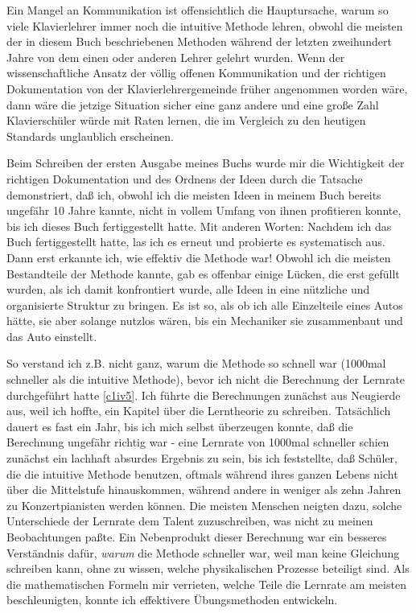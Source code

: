 Ein Mangel an Kommunikation ist offensichtlich die Hauptursache, warum so viele Klavierlehrer immer noch die intuitive Methode lehren, obwohl die meisten der in diesem Buch beschriebenen Methoden während der letzten zweihundert Jahre von dem einen oder anderen Lehrer gelehrt wurden.
Wenn der wissenschaftliche Ansatz der völlig offenen Kommunikation und der richtigen Dokumentation von der Klavierlehrergemeinde früher angenommen worden wäre, dann wäre die jetzige Situation sicher eine ganz andere und eine große Zahl Klavierschüler würde mit Raten lernen, die im Vergleich zu den heutigen Standards unglaublich erscheinen.

Beim Schreiben der ersten Ausgabe meines Buchs wurde mir die Wichtigkeit der richtigen Dokumentation und des Ordnens der Ideen durch die Tatsache demonstriert, daß ich, obwohl ich die meisten Ideen in meinem Buch bereits ungefähr 10 Jahre kannte, nicht in vollem Umfang von ihnen profitieren konnte, bis ich dieses Buch fertiggestellt hatte.
Mit anderen Worten: Nachdem ich das Buch fertiggestellt hatte, las ich es erneut und probierte es systematisch aus.
Dann erst erkannte ich, wie effektiv die Methode war!
Obwohl ich die meisten Bestandteile der Methode kannte, gab es offenbar einige Lücken, die erst gefüllt wurden, als ich damit konfrontiert wurde, alle Ideen in eine nützliche und organisierte Struktur zu bringen.
Es ist so, als ob ich alle Einzelteile eines Autos hätte, sie aber solange nutzlos wären, bis ein Mechaniker sie zusammenbaut und das Auto einstellt.

So verstand ich z.B. nicht ganz, warum die Methode so schnell war (1000mal schneller als die intuitive Methode), bevor ich nicht die Berechnung der Lernrate durchgeführt hatte \hyperref[c1iv5]{\autoref{c1iv5}}.
Ich führte die Berechnungen zunächst aus Neugierde aus, weil ich hoffte, ein Kapitel über die Lerntheorie zu schreiben.
Tatsächlich dauert es fast ein Jahr, bis ich mich selbst überzeugen konnte, daß die Berechnung ungefähr richtig war - eine Lernrate von 1000mal schneller schien zunächst ein lachhaft absurdes Ergebnis zu sein, bis ich feststellte, daß Schüler, die die intuitive Methode benutzen, oftmals während ihres ganzen Lebens nicht über die Mittelstufe hinauskommen, während andere in weniger als zehn Jahren zu Konzertpianisten werden können.
Die meisten Menschen neigten dazu, solche Unterschiede der Lernrate dem Talent zuzuschreiben, was nicht zu meinen Beobachtungen paßte.
Ein Nebenprodukt dieser Berechnung war ein besseres Verständnis dafür, \textit{warum} die Methode schneller war, weil man keine Gleichung schreiben kann, ohne zu wissen, welche physikalischen Prozesse beteiligt sind.
Als die mathematischen Formeln mir verrieten, welche Teile die Lernrate am meisten beschleunigten, konnte ich effektivere Übungsmethoden entwickeln.

